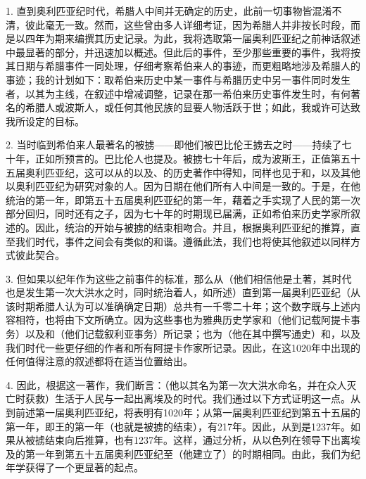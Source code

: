 1. 直到奥利匹亚纪时代，希腊人中间并无确定的历史，此前一切事物皆混淆不清，彼此毫无一致。然而，这些曾由多人详细考证，因为希腊人并非按长时段，而是以四年为期来编撰其历史记录。为此，我将选取第一届奥利匹亚纪之前神话叙述中最显著的部分，并迅速加以概述。但此后的事件，至少那些重要的事件，我将按其日期与希腊事件一同处理，仔细考察希伯来人的事迹，而更粗略地涉及希腊人的事迹；我的计划如下：取希伯来历史中某一事件与希腊历史中另一事件同时发生者，以其为主线，在叙述中增减调整，记录在那一希伯来历史事件发生时，有何著名的希腊人或波斯人，或任何其他民族的显要人物活跃于世；如此，我或许可达致我所设定的目标。\par

2. 当时临到希伯来人最著名的被掳——即他们被巴比伦王掳去之时——持续了七十年，正如所预言的。巴比伦人也提及。被掳七十年后，成为波斯王，正值第五十五届奥利匹亚纪，这可以从的以及、的历史著作中得知，同样也见于和，以及其他以奥利匹亚纪为研究对象的人。因为日期在他们所有人中间是一致的。于是，在他统治的第一年，即第五十五届奥利匹亚纪的第一年，藉着之手实现了人民的第一次部分回归，同时还有之子，因为七十年的时期现已届满，正如希伯来历史学家所叙述的。因此，统治的开始与被掳的结束相吻合。并且，根据奥利匹亚纪的推算，直至我们时代，事件之间会有类似的和谐。遵循此法，我们也将使其他叙述以同样方式彼此契合。\par

3. 但如果以纪年作为这些之前事件的标准，那么从（他们相信他是土著，其时代也是发生第一次大洪水之时，同时统治着人，如所述）直到第一届奥利匹亚纪（从该时期希腊人认为可以准确确定日期）总共有一千零二十年；这个数字既与上述内容相符，也将由下文所确立。因为这些事也为雅典历史学家和（他们记载阿提卡事务）以及和（他们记载叙利亚事务）所记录；也为（他在其中撰写通史）和，以及我们时代一些更仔细的作者和所有阿提卡作家所记录。因此，在这1020年中出现的任何值得注意的叙述都将在适当位置给出。\par

4. 因此，根据这一著作，我们断言：（他以其名为第一次大洪水命名，并在众人灭亡时获救）生活于人民与一起出离埃及的时代。我们通过以下方式证明这一点。从到前述第一届奥利匹亚纪，将表明有1020年；从第一届奥利匹亚纪到第五十五届的第一年，即王的第一年（也就是被掳的结束），有217年。因此，从到是1237年。如果从被掳结束向后推算，也有1237年。这样，通过分析，从以色列在领导下出离埃及的第一年到第五十五届奥利匹亚纪至（他建立了）的时期相同。由此，我们为纪年学获得了一个更显著的起点。\par

